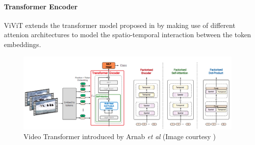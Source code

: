 \paragraph{Transformer Encoder}

\par ViViT extends the transformer model proposed in \cite{vit} by making use of different attenion architectures to model the spatio-temporal interaction between the token embeddings. \par

\begin{figure}[h]
	\includegraphics[width=\linewidth]{assets/img/vivit.png}
	\caption{Video Transformer introduced by Arnab \textit{et al} (Image courtesy \cite{vivit})}
\end{figure}

